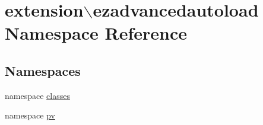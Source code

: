 \hypertarget{namespaceextension_1_1ezadvancedautoload}{\section{extension$\backslash$ezadvancedautoload Namespace Reference}
\label{namespaceextension_1_1ezadvancedautoload}
}
\subsection*{Namespaces}
\begin{DoxyCompactItemize}
\item 
namespace \hyperlink{namespaceextension_1_1ezadvancedautoload_1_1classes}{classes}
\item 
namespace \hyperlink{namespaceextension_1_1ezadvancedautoload_1_1pv}{pv}
\end{DoxyCompactItemize}
